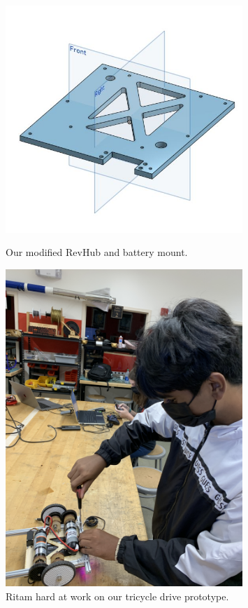 \begin{figure}[ht]
\centering
\begin{minipage}[b]{.50\textwidth}
  \centering
  \includegraphics[width=0.8\textwidth]{Meetings/October/10-10-21/10-10-2021_Hardware_Figure1 - Nathan Forrer.JPG}
  \caption{Our modified RevHub and battery mount.}
  \label{fig:pic1}
\end{minipage}%
\hfill%
\begin{minipage}[b]{.50\textwidth}
  \centering
  \includegraphics[width=0.8\textwidth]{Meetings/October/10-10-21/10-10-2021_Hardware_Figure2 - Nathan Forrer.JPG}
  \caption{Ritam hard at work on our tricycle drive prototype.}
  \label{fig:pic2}
\end{minipage}
\end{figure}







